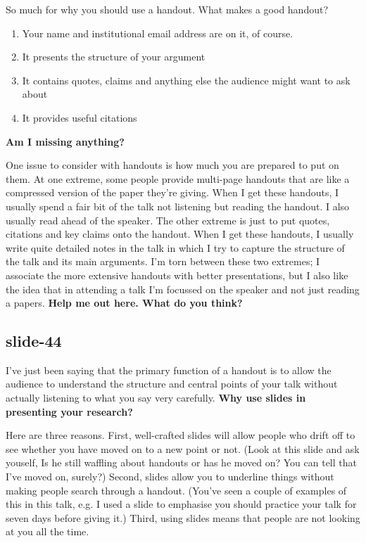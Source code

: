 \documentclass[12pt,\papersize]{extarticle}
\begin{document}
So much for why you should use a handout.
What makes a good handout?
\begin{enumerate}
\item Your name and institutional email address are on it, of course.
\item It presents the structure of your argument
\item It contains quotes, claims and anything else the audience might want to ask about
\item It provides useful citations
\end{enumerate}
\textbf{Am I missing anything?}
 
One issue to consider with handouts is how much you are prepared to put on them.
At one extreme, 
some people provide multi-page handouts that are like a compressed version of the paper they're 
giving.
When I get these handouts, I usually spend a fair bit of the talk not listening but reading the 
handout.   I also usually read ahead of the speaker.
The other extreme is just to put quotes, citations and key claims onto the handout.
When I get these handouts, I usually write quite detailed notes in the talk in which I try to 
capture the structure of the talk and its main arguments.
I'm torn between these two extremes; I associate the more extensive handouts with better 
presentations, but I also like the idea that in attending a talk I'm focussed on the speaker and 
not just reading a papers.
\textbf{Help me out here.  What do you think?}
 
\subsection{slide-44}
I've just been saying that 
the primary function of a handout is to allow the audience to understand the structure and central
points of your talk without actually listening to what you say very carefully.
\textbf{Why use slides in presenting your research?}
 
Here are three reasons.
First, well-crafted slides will allow people who drift off to see whether you have moved on to a 
new point or not.
(Look at this slide and ask youself, Is he still waffling about handouts or has he moved on?  You can 
tell that I've moved on, surely?)
Second, slides allow you to underline things without making people search through a handout.
(You've seen a couple of examples of this in this talk, e.g. I used a slide to emphasise 
you should practice your talk for seven days before giving it.)
Third, using slides means that people are not looking at you all the time.
 
\end{document}
